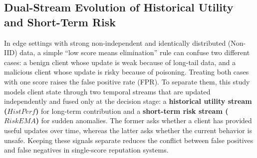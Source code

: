 \documentclass[final,5p,times,twocolumn]{elsarticle/elsarticle}
\begin{document}
\subsection{Dual-Stream Evolution of Historical Utility and Short-Term Risk}
In edge settings with strong non-independent and identically distributed (Non-IID) data, a simple ``low score means elimination'' rule can confuse two different cases: a benign client whose update is weak because of long-tail data, and a malicious client whose update is risky because of poisoning. Treating both cases with one score raises the false positive rate (FPR). To separate them, this study models client state through two temporal streams that are updated independently and fused only at the decision stage: a \textbf{historical utility stream ($HistPerf$)} for long-term contribution and a \textbf{short-term risk stream ($RiskEMA$)} for sudden anomalies. The former asks whether a client has provided useful updates over time, whereas the latter asks whether the current behavior is unsafe. Keeping these signals separate reduces the conflict between false positives and false negatives in single-score reputation systems.
\end{document}
